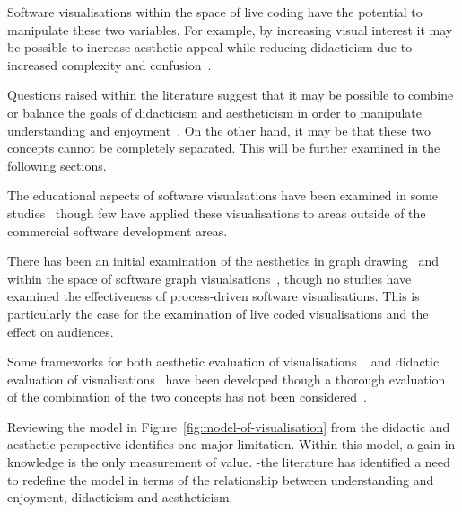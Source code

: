 Software visualisations within the space of live coding have the potential to manipulate these two variables. For example, by increasing visual interest it may be possible to increase aesthetic appeal while reducing didacticism due to increased complexity and confusion~.

Questions raised within the literature suggest that it may be possible to combine or balance the goals of didacticism and aestheticism in order to manipulate understanding and enjoyment~. On the other hand, it may be that these two concepts cannot be completely separated. This will be further examined in the following sections.

The educational aspects of software visualsations have been examined in some studies~ though few have applied these visualisations to areas outside of the commercial software development areas.

There has been an initial examination of the aesthetics in graph drawing~ and within the space of software graph visualsations~, though no studies have examined the effectiveness of process-driven software visualisations. This is particularly the case for the examination of live coded visualisations and the effect on audiences.

Some frameworks for both aesthetic evaluation of visualisations
~ and didactic evaluation of visualisations~ have been developed though a thorough evaluation of the combination of the two concepts has not been considered~.

Reviewing the model in Figure~\ref{fig:model-of-visualisation} from the didactic and aesthetic perspective identifies one major limitation. Within this model, a gain in knowledge is the only measurement of value.
-the literature has identified a need to redefine the model in terms of the relationship between understanding and enjoyment, didacticism and aestheticism.


